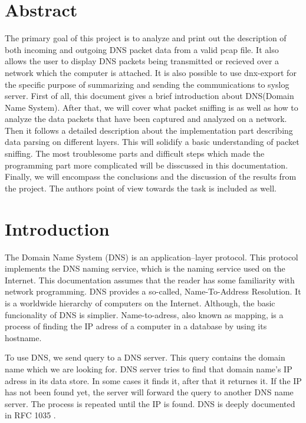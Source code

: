 \documentclass[11pt,a4paper]{article}
\begin{document}


\setlength{\parskip}{0pt}
\hypersetup{hidelinks}\tableofcontents
\setlength{\parskip}{0pt}

\newpage %

\section{Abstract}

The primary goal of this project is to analyze and print out the description of both incoming and outgoing DNS packet data from a valid pcap file. It also allows the user to display DNS packets being transmitted or recieved over a network which the computer is attached. It is also possible to use dnx-export for the specific purpose of summarizing and sending the communications to syslog server. First of all, this document gives a brief introduction about DNS(Domain Name System). After that, we will cover what packet sniffing is as well as how to analyze the data packets that have been captured and analyzed on a network. Then it follows a detailed description about the implementation part describing data parsing on different layers. This will solidify a basic understanding of packet sniffing. The most troublesome parts and difficult steps which made the programming part more complicated will be disscussed in this documentation. Finally, we will encompass the conclusions and the discussion of the results from the project. The authors point of view towards the task is included as well.

\section{Introduction}

The Domain Name System (DNS) is an application–layer protocol. This protocol implements the DNS naming service, which is the naming service used on the Internet. This documentation assumes that the reader has some familiarity with network programming. DNS provides a so-called, Name-To-Address Resolution. It is a worldwide hierarchy of computers on the Internet. Although, the basic funcionality of DNS is simplier. Name-to-adress, also known as mapping, is a process of finding the IP adress of a computer in a database by using its hostname.

To use DNS, we send query to a DNS server. This query contains the domain name which we are looking for. DNS server tries to find that domain name's IP adress in its data store. In some cases it finds it, after that it returnes it. If the IP has not been found yet, the server will forward the query to another DNS name server. The process is repeated until the IP is found.\cite{DNS} DNS is deeply documented in RFC 1035 \cite{RFC1035}.
\end{document}
